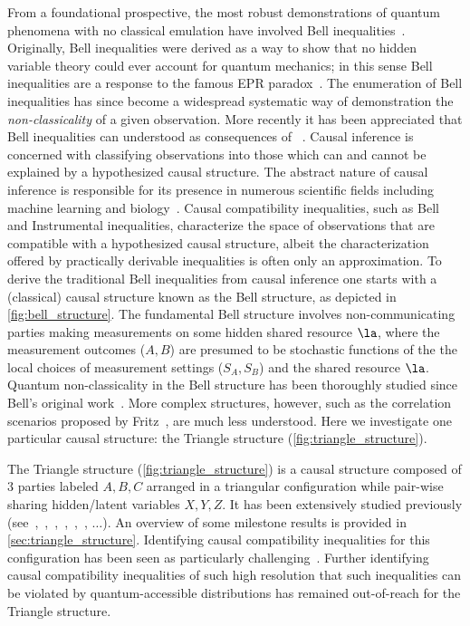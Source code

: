 \documentclass[aps, 10pt, english, twoside, pra, nofootinbib, tightenlines, longbibliography, superscriptaddress]{revtex4-1}
\begin{document}
    From a foundational prospective, the most robust demonstrations of quantum phenomena with no classical emulation have involved Bell inequalities~\cite{Bell_1964}. Originally, Bell inequalities were derived as a way to show that no hidden variable theory could ever account for quantum mechanics; in this sense Bell inequalities are a response to the famous EPR paradox~\cite{EPR_Orig}. The enumeration of Bell inequalities has since become a widespread systematic way of demonstration the \textit{non-classicality} of a given observation. More recently it has been appreciated that Bell inequalities can understood as consequences of ~\cite{Wood_2012}. Causal inference is concerned with classifying observations into those which can and cannot be explained by a hypothesized causal structure. The abstract nature of causal inference is responsible for its presence in numerous scientific fields including machine learning and biology~\cite{Pearl_2009,Pearl_2009_tr}. Causal compatibility inequalities, such as Bell and Instrumental inequalities, characterize the space of observations that are compatible with a hypothesized causal structure, albeit the characterization offered by practically derivable inequalities is often only an approximation. To derive the traditional Bell inequalities from causal inference one starts with a (classical) causal structure known as the Bell structure, as depicted in \cref{fig:bell_structure}. The fundamental Bell structure involves non-communicating parties making measurements on some hidden shared resource $\la$, where the measurement outcomes ($A, B$) are presumed to be stochastic functions of the the local choices of measurement settings ($S_A, S_B$) and the shared resource $\la$. Quantum non-classicality in the Bell structure has been thoroughly studied since Bell's original work~\cite{Brunner_2013}. More complex structures, however, such as the correlation scenarios proposed by Fritz~\cite{Fritz_2012,Fritz_2014}, are much less understood. Here we investigate one particular causal structure: the Triangle structure (\cref{fig:triangle_structure}).

    The Triangle structure (\cref{fig:triangle_structure}) is a causal structure composed of $3$ parties labeled $A, B, C$ arranged in a triangular configuration while pair-wise sharing hidden/latent variables $X, Y, Z$. It has been extensively studied previously (see~\cite[Fig. 1]{Steudel_2010},~\cite[Fig. 6]{Chaves_2014},~\cite[Fig. 8]{Branciard_2012},~\cite[Fig. 8, App. E]{Henson_2014},~\cite[Fig. 3]{Fritz_2012},~\cite[Fig. 1]{Inflation}, $\ldots$). An overview of some milestone results is provided in \cref{sec:triangle_structure}. Identifying causal compatibility inequalities for this configuration has been seen as particularly challenging~\cite{Branciard_2012}. Further identifying causal compatibility inequalities of such high resolution that such inequalities can be violated by quantum-accessible distributions has remained out-of-reach for the Triangle structure.
\end{document}

